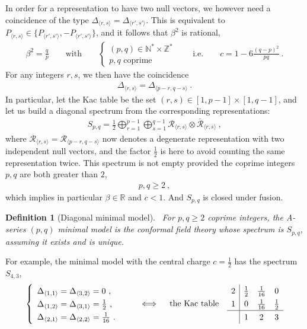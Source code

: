 \documentclass[12pt, a4paper]{article}
\theoremstyle{break}
\newtheorem{defn}[exo]{Definition}
\begin{document}
In order for a representation to have two null vectors, we however need a coincidence of 
the type $\Delta_{\langle r,s \rangle} = \Delta_{\langle r',s' \rangle}$. 
This is equivalent to $P_{\langle r,s \rangle} \in \{ P_{\langle r',s' \rangle}, -P_{\langle r',s' \rangle}\}$, and it follows that
$\beta^2$ is rational,
\begin{align} 
 \beta^2 =  \frac{q}{p} \qquad \text{with} \qquad \left\{\begin{array}{l} (p,q)\in \mathbb{N}^*\times \mathbb{Z}^* \\ p, q\text{ coprime} \end{array} \right. 
 \qquad \text{i.e.} \qquad c = 1-6\frac{(q-p)^2}{pq}\ .
 \label{eq:bcmin}
\end{align}
For any integers $r,s$, we then have the coincidence 
\begin{align}
 \Delta_{\langle r,s \rangle} = \Delta_{\langle p-r, q-s\rangle}\ .
\end{align}
In particular, let the Kac table be the set $(r,s)\in [1, p-1]\times [1,q-1]$, and let us build a diagonal spectrum from the corresponding representations:
\begin{align}
 S_{p, q} = \frac12 \bigoplus_{r=1}^{p-1} \bigoplus_{s=1}^{q-1} \mathcal{R}_{\langle r,s \rangle}\otimes \mathcal{\bar{R}}_{\langle r,s \rangle}\ ,
\end{align}
where  $\mathcal{R}_{\langle r,s \rangle}=\mathcal{R}_{\langle p-r,q-s \rangle}$ now denotes a degenerate representation with two independent null vectors, and the factor $\frac12$ is here to avoid counting the same representation twice.
This spectrum is not empty provided the coprime integers $p,q$ are both greater than $2$,
\begin{align}
 p,q \geq 2 \ ,
 \label{eq:pqmin}
\end{align}
which implies in particular $\beta\in \mathbb{R}$ and $c<1$. And $S_{p, q}$ is closed under fusion.

\begin{defn}[Diagonal minimal model]
 ~\label{def:dmm}
 For $p,q\geq 2$ coprime integers, the A-series $(p,q)$ minimal model is the conformal field theory whose spectrum is $S_{p, q}$, assuming it exists and is unique.
\end{defn}
For example, the minimal model with the central charge $c=\frac12$ has the spectrum $S_{4,3}$, 
\begin{align}
\renewcommand{\arraystretch}{1.3}
 \left\{\begin{array}{l} \Delta_{\langle 1,1\rangle}=\Delta_{\langle 3,2\rangle} = 0 \ , \\ \Delta_{\langle 1,2\rangle} =\Delta_{\langle 3,1\rangle} = \frac12 \ , \\ \Delta_{\langle 2,1\rangle} =\Delta_{\langle 2,2\rangle} = \frac{1}{16} \ .\end{array}\right. 
 \qquad \iff \quad \text{the Kac table} \quad 
 \begin{array}{c|ccc} 2 & \frac{1}{2} & \frac{1}{16} & 0 \\ 1 & 0 & \frac{1}{16} & \frac{1}{2} \\  \hline & 1 & 2 & 3 \end{array} 
\end{align}
\end{document}
